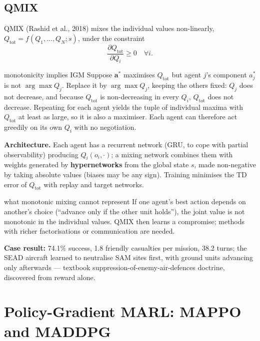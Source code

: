 \documentclass[11pt]{article}
\begin{document}
\subsection{QMIX}
QMIX (Rashid et al., 2018) mixes the individual values non-linearly, $Q_{\text{tot}}=f(Q_1,\ldots,Q_N;s)$, under the constraint
\[\frac{\partial Q_{\text{tot}}}{\partial Q_i}\ge0\quad\forall i.\]
\begin{derivation}{monotonicity implies IGM}
Suppose $\mathbf a^*$ maximises $Q_{\text{tot}}$ but agent $j$'s component $a_j^*$ is not $\arg\max Q_j$. Replace it by $\arg\max Q_j$, keeping the others fixed: $Q_j$ does not decrease, and because $Q_{\text{tot}}$ is non-decreasing in every $Q_i$, $Q_{\text{tot}}$ does not decrease. Repeating for each agent yields the tuple of individual maxima with $Q_{\text{tot}}$ at least as large, so it is also a maximiser. Each agent can therefore act greedily on its own $Q_i$ with no negotiation.
\end{derivation}
\textbf{Architecture.} Each agent has a recurrent network (GRU, to cope with partial observability) producing $Q_i(o_i,\cdot)$; a mixing network combines them with weights generated by \textbf{hypernetworks} from the global state $s$, made non-negative by taking absolute values (biases may be any sign). Training minimises the TD error of $Q_{\text{tot}}$ with replay and target networks.
\begin{pitfall}{what monotonic mixing cannot represent}
If one agent's best action depends on another's choice (``advance only if the other unit holds''), the joint value is not monotonic in the individual values. QMIX then learns a compromise; methods with richer factorisations or communication are needed.
\end{pitfall}
\textbf{Case result:} 74.1\% success, 1.8 friendly casualties per mission, 38.2 turns; the SEAD aircraft learned to neutralise SAM sites first, with ground units advancing only afterwards --- textbook suppression-of-enemy-air-defences doctrine, discovered from reward alone.

\section{Policy-Gradient MARL: MAPPO and MADDPG}
\end{document}
